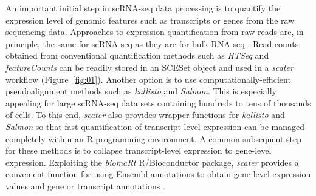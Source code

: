 \documentclass{bioinfo}
\begin{document}
An important initial step in scRNA-seq data processing is to quantify the expression level of genomic features such as transcripts or genes from the raw sequencing data. Approaches to expression quantification from raw reads are, in principle, the same for scRNA-seq as they are for bulk RNA-seq \citep{Kanitz2015-wp,Teng2016-sc}. Read counts obtained from conventional quantification methods such as \emph{HTSeq} \citep{Anders2015-wf} and \emph{featureCounts} \citep{Liao2014-ui} can be readily stored in an SCESet object and used in a \emph{scater} workflow (Figure~\ref{fig:01}). Another option is to use computationally-efficient pseudoalignment methods such as \emph{kallisto} and \emph{Salmon}. This is especially appealing for large scRNA-seq data sets containing hundreds to tens of thousands of cells. To this end, \emph{scater} also provides wrapper functions for \emph{kallisto} and \emph{Salmon} so that fast quantification of transcript-level expression can be managed completely within an R programming environment. A common subsequent step for these methods is to collapse transcript-level expression to gene-level expression. Exploiting the \emph{biomaRt} R/Bioconductor package, \emph{scater} provides a convenient function for using Ensembl annotations to obtain
gene-level expression values and gene or transcript annotations \citep{Yates2016-ia}.

\enlargethispage{6pt}
\end{document}
